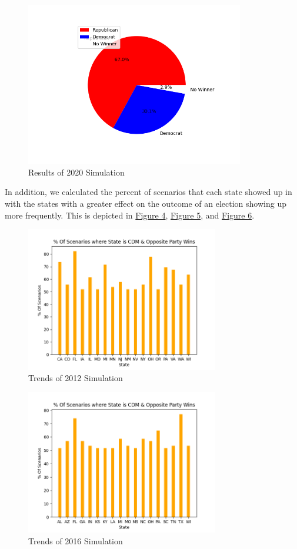 \documentclass{article}
\begin{document}
\begin{figure}
\centering
\includegraphics[width=0.85\textwidth]{data-2020.png}
\caption{\label{fig:2020}Results of 2020 Simulation}
\end{figure}

In addition, we calculated the percent of scenarios that each state showed up in with the states with a greater effect on the outcome of an election showing up more frequently. This is depicted in \hyperref[fig:t2012]{Figure 4}, \hyperref[fig:t2016]{Figure 5}, and \hyperref[fig:t2020]{Figure 6}.

\begin{figure}
\centering
\includegraphics[width=0.75\textwidth]{trend-2012.png}
\caption{\label{fig:t2012}Trends of 2012 Simulation}
\end{figure}

\begin{figure}
\centering
\includegraphics[width=0.75\textwidth]{trend-2016.png}
\caption{\label{fig:t2016}Trends of 2016 Simulation}
\end{figure}
\end{document}
